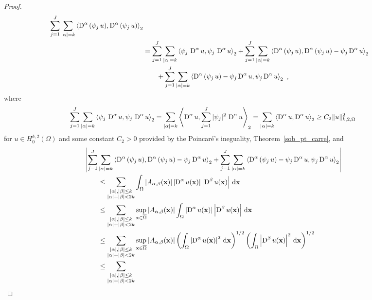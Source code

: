 \begin{proof}
\begin{align}
\sum_{j=1}^J  \sum_{|\alpha| = k}
\left\langle{\operatorname{D}^\alpha\left( \psi_j \, u\right)} , {\operatorname{D}^\alpha\left( \psi_j \, u\right)}\right\rangle_2 \nonumber \\
&= \sum_{j=1}^J  \sum_{|\alpha| = k}
\left\langle{\psi_j \,\operatorname{D}^\alpha u} , {\psi_j \, \operatorname{D}^\alpha u}\right\rangle_2
+ \sum_{j=1}^J  \sum_{|\alpha|= k}
\left\langle{\operatorname{D}^\alpha\left( \psi_j \, u\right)} , {\operatorname{D}^\alpha\left( \psi_j \, u\right) - \psi_j \operatorname{D}^\alpha u}\right\rangle_2 \nonumber \\
&\qquad + \sum_{j=1}^J  \sum_{|\alpha|= k}
\left\langle{\operatorname{D}^\alpha\left( \psi_j \, u\right) - \psi_j \operatorname{D}^\alpha u} , {\psi_j \operatorname{D}^\alpha u}\right\rangle_2
\ , \label{ell_garding_idx4}
\end{align}
where
\[
\sum_{j=1}^J  \sum_{|\alpha| = k}
\left\langle{\psi_j \,\operatorname{D}^\alpha u} , {\psi_j \, \operatorname{D}^\alpha u}\right\rangle_2
= \sum_{|\alpha| = k}
\left\langle{\operatorname{D}^\alpha u} , { \sum_{j=1}^J |\psi_j|^2 \,\operatorname{D}^\alpha u}\right\rangle_2
= \sum_{|\alpha| = k} \left\langle{\operatorname{D}^\alpha u} , {\operatorname{D}^\alpha u}\right\rangle_2
\geq C_2 \|u\|_{k,2,\Omega}^2
\]
for $\displaystyle u \in H^{k,2}_0(\Omega)$ and
some constant $C_2>0$ provided by the Poincaré's ineguality,
Theorem~\ref{sob_pt_carre}, and
\begin{align*}
& \left| \sum_{j=1}^J \sum_{|\alpha|= k}
\ps{\diff^\alpha\left( \psi_j \, u\right)}
{\diff^\alpha\left( \psi_j \, u\right) - \psi_j \diff^\alpha u}_2
+ \sum_{j=1}^J  \sum_{|\alpha|= k}
\ps{\diff^\alpha\left( \psi_j \, u\right) - \psi_j \diff^\alpha u}{\psi_j \diff^\alpha u}_2
\right| \\
&\qquad \leq \sum_{\substack{|\alpha|,|\beta|\leq k\\|\alpha|+|\beta|<2k}}
\int_\Omega \left| A_{\alpha,\beta}(\VEC{x})\right|
\left| \diff^\alpha u(\VEC{x}) \right|
\left| \diff^\beta u(\VEC{x}) \right| \dx{\VEC{x}} \\
&\qquad \leq \sum_{\substack{|\alpha|,|\beta|\leq k\\|\alpha|+|\beta|<2k}}
\sup_{\VEC{x} \in \overline{\Omega}} \left| A_{\alpha,\beta}(\VEC{x})\right|
\int_\Omega \left| \diff^\alpha u(\VEC{x}) \right|
\left| \diff^\beta u(\VEC{x}) \right| \dx{\VEC{x}} \\
&\qquad \leq \sum_{\substack{|\alpha|,|\beta|\leq k\\|\alpha|+|\beta|<2k}}
\sup_{\VEC{x} \in \overline{\Omega}} \left| A_{\alpha,\beta}(\VEC{x})\right|
\left( \int_\Omega \left| \diff^\alpha u(\VEC{x}) \right|^2
\dx{\VEC{x}}\right)^{1/2}
\left( \int_\Omega \left| \diff^\beta u(\VEC{x}) \right|^2 \dx{\VEC{x}}
\right)^{1/2} \\
&\qquad \leq \sum_{\substack{|\alpha|,|\beta|\leq k\\|\alpha|+|\beta|<2k}}

\end{align*}
\end{proof}
